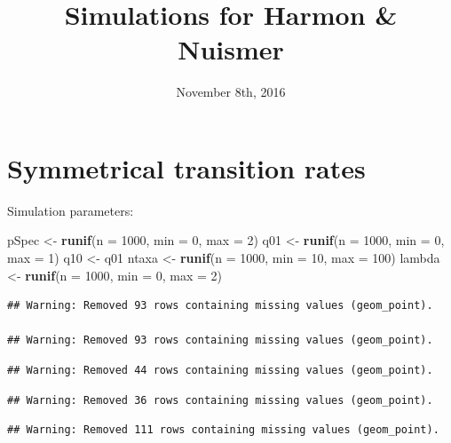 \documentclass[12pt,]{article}
\title{Simulations for Harmon \& Nuismer}
\author{}
\date{November 8th, 2016}
\newenvironment{Shaded}{\begin{snugshade}}{\end{snugshade}}
\newcommand{\KeywordTok}[1]{\textcolor[rgb]{0.13,0.29,0.53}{\textbf{{#1}}}}
\newcommand{\DataTypeTok}[1]{\textcolor[rgb]{0.13,0.29,0.53}{{#1}}}
\newcommand{\DecValTok}[1]{\textcolor[rgb]{0.00,0.00,0.81}{{#1}}}
\newcommand{\StringTok}[1]{\textcolor[rgb]{0.31,0.60,0.02}{{#1}}}
\newcommand{\NormalTok}[1]{{#1}}
\begin{document}
\maketitle

\linenumbers
{} \setlength{\parindent}{1.0cm} \raggedright

\section{Symmetrical transition
rates}\label{symmetrical-transition-rates}

Simulation parameters:

\begin{Shaded}
\begin{Highlighting}[]
\NormalTok{pSpec <-}\StringTok{ }\KeywordTok{runif}\NormalTok{(}\DataTypeTok{n =} \DecValTok{1000}\NormalTok{, }\DataTypeTok{min =} \DecValTok{0}\NormalTok{, }\DataTypeTok{max =} \DecValTok{2}\NormalTok{)}
\NormalTok{q01 <-}\StringTok{ }\KeywordTok{runif}\NormalTok{(}\DataTypeTok{n =} \DecValTok{1000}\NormalTok{, }\DataTypeTok{min =} \DecValTok{0}\NormalTok{, }\DataTypeTok{max =} \DecValTok{1}\NormalTok{)}
\NormalTok{q10 <-}\StringTok{ }\NormalTok{q01}
\NormalTok{ntaxa <-}\StringTok{ }\KeywordTok{runif}\NormalTok{(}\DataTypeTok{n =} \DecValTok{1000}\NormalTok{, }\DataTypeTok{min =} \DecValTok{10}\NormalTok{, }\DataTypeTok{max =} \DecValTok{100}\NormalTok{)}
\NormalTok{lambda <-}\StringTok{ }\KeywordTok{runif}\NormalTok{(}\DataTypeTok{n =} \DecValTok{1000}\NormalTok{, }\DataTypeTok{min =} \DecValTok{0}\NormalTok{, }\DataTypeTok{max =} \DecValTok{2}\NormalTok{)}
\end{Highlighting}
\end{Shaded}

\begin{verbatim}
## Warning: Removed 93 rows containing missing values (geom_point).

## Warning: Removed 93 rows containing missing values (geom_point).
\end{verbatim}

\begin{verbatim}
## Warning: Removed 44 rows containing missing values (geom_point).
\end{verbatim}

\begin{verbatim}
## Warning: Removed 36 rows containing missing values (geom_point).
\end{verbatim}

\begin{verbatim}
## Warning: Removed 111 rows containing missing values (geom_point).
\end{verbatim}
\end{document}
